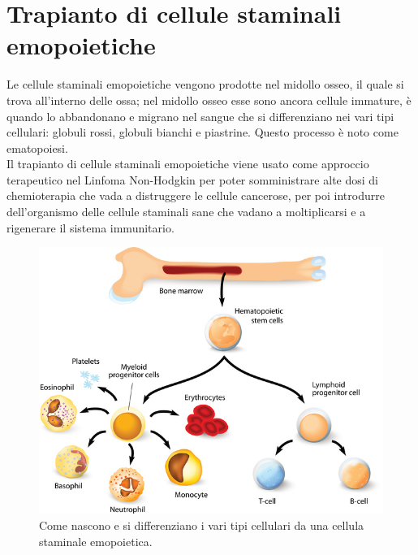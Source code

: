 \section{Trapianto di cellule staminali emopoietiche}

Le cellule staminali emopoietiche vengono prodotte nel midollo osseo, il quale si trova all’interno delle ossa; 
nel midollo osseo esse sono ancora cellule immature, è quando lo abbandonano e migrano nel sangue che si 
differenziano nei vari tipi cellulari: globuli rossi, globuli bianchi e piastrine. 
Questo processo è noto come ematopoiesi\cite{TRAPIANTO}.\\
Il trapianto di cellule staminali emopoietiche viene usato come approccio terapeutico nel Linfoma Non-Hodgkin per 
poter somministrare alte dosi di chemioterapia che vada a distruggere le cellule cancerose, per poi introdurre 
dell’organismo delle cellule staminali sane che vadano a moltiplicarsi e a rigenerare il sistema immunitario.

\begin{figure}[H]
    \begin{center}
    \includegraphics[width=0.6\columnwidth]{img/transplant.jpeg}
    \end{center}
    \caption[Come nascono e si differenziano i vari tipi cellulari da una cellula staminale emopoietica.]{Come nascono e si differenziano i vari tipi cellulari da una cellula staminale emopoietica.
    \cite{img35}}

\end{figure}

